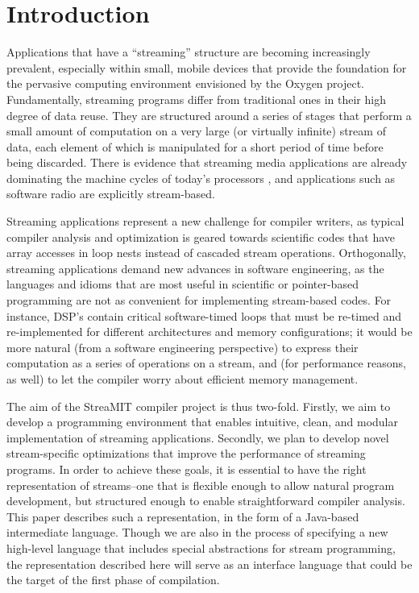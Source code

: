 \documentclass[10pt]{article}
\begin{document}
 



\section{Introduction}

Applications that have a ``streaming'' structure are becoming
increasingly prevalent, especially within small, mobile devices that
provide the foundation for the pervasive computing environment
envisioned by the Oxygen project.  Fundamentally, streaming programs
differ from traditional ones in their high degree of data reuse.  They
are structured around a series of stages that perform a small amount
of computation on a very large (or virtually infinite) stream of data,
each element of which is manipulated for a short period of time before
being discarded.  There is evidence that streaming media applications
are already dominating the machine cycles of today's processors
\cite{Rix98}, and applications such as software radio \cite{Bos99} are
explicitly stream-based.

Streaming applications represent a new challenge for compiler writers,
as typical compiler analysis and optimization is geared towards
scientific codes that have array accesses in loop nests instead of
cascaded stream operations.  Orthogonally, streaming applications
demand new advances in software engineering, as the languages and
idioms that are most useful in scientific or pointer-based programming
are not as convenient for implementing stream-based codes.  For
instance, DSP's contain critical software-timed loops that must be
re-timed and re-implemented for different architectures and memory
configurations; it would be more natural (from a software engineering
perspective) to express their computation as a series of operations on
a stream, and (for performance reasons, as well) to let the compiler
worry about efficient memory management.

The aim of the StreaMIT compiler project is thus two-fold.  Firstly,
we aim to develop a programming environment that enables intuitive,
clean, and modular implementation of streaming applications.
Secondly, we plan to develop novel stream-specific optimizations that
improve the performance of streaming programs.  In order to achieve
these goals, it is essential to have the right representation of
streams--one that is flexible enough to allow natural program
development, but structured enough to enable straightforward compiler
analysis.  This paper describes such a representation, in the form of
a Java-based intermediate language.  Though we are also in the process
of specifying a new high-level language that includes special
abstractions for stream programming, the representation described here
will serve as an interface language that could be the target of the
first phase of compilation.
\end{document}
